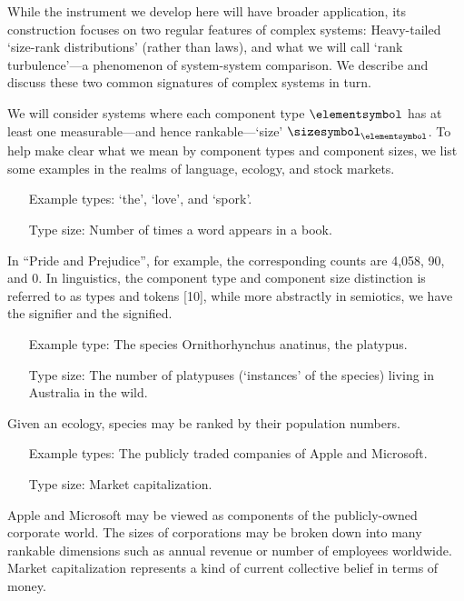 \begin{excerpt}
  While the instrument we develop here will have broader application,
  its construction focuses on two regular features of complex systems:
  Heavy-tailed `size-rank distributions' (rather than laws),
  and
  what we will call `rank turbulence'---a phenomenon of system-system comparison.
  We describe and discuss these two common signatures of complex systems in turn.

  We will consider systems where
  each component type $\elementsymbol$ has at
  least one measurable---and hence rankable---`size' $\sizesymbol_{\elementsymbol}$.
  To help make clear what we mean by component types and component sizes,
  we list some examples in the realms of language, ecology, and stock markets.

  \begin{itemize}[leftmargin=70pt]
  \item[Example types:]
    `the', `love', and `spork'.
  \item[Type size:]
    Number of times a word appears in a book.
  \end{itemize}
  In ``Pride and Prejudice'', for example,
  the corresponding counts are
  4,058, %
  90, %
  and
  0. %
  In linguistics, the component type and component size distinction is
  referred to as types and tokens [10],
  while more abstractly in semiotics, we have the signifier and the signified.

  \begin{itemize}[leftmargin=70pt]
  \item[Example type:]
    The species Ornithorhynchus anatinus, the platypus.\\
  \item[Type size:]
    The number of platypuses (`instances' of the species) living in Australia in the wild.\\
  \end{itemize}
  Given an ecology, species may be ranked by their population numbers.

  \begin{itemize}[leftmargin=70pt]
  \item[Example types:]
    The publicly traded companies of Apple and Microsoft.
  \item[Type size:]
    Market capitalization.
  \end{itemize}
  Apple and Microsoft may be viewed as components of the publicly-owned corporate world.
  The sizes of corporations may be broken down into many rankable dimensions
  such as annual revenue or number of employees worldwide.
  Market capitalization represents a kind of current collective belief
  in terms of money.


\end{excerpt}
